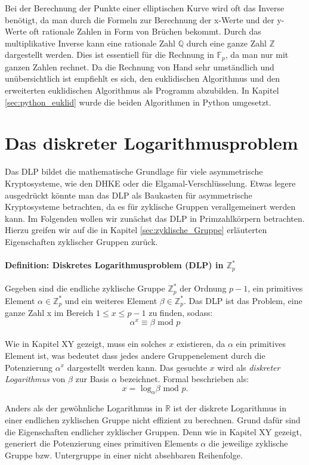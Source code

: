 Bei der Berechnung der Punkte einer elliptischen Kurve wird oft das Inverse benötigt, da man durch die Formeln zur Berechnung der x-Werte und der y-Werte oft rationale Zahlen in Form von Brüchen bekommt. Durch das multiplikative Inverse kann eine rationale Zahl $\mathbb{Q}$ durch eine ganze Zahl $\mathbb{Z}$ dargestellt werden. Dies ist essentiell für die Rechnung in $\mathbb{F}_p$, da man nur mit ganzen Zahlen rechnet. Da die Rechnung von Hand sehr umständlich und unübersichtlich ist empfiehlt es sich, den euklidischen Algorithmus und den erweiterten euklidischen Algorithmus als Programm abzubilden. In Kapitel \ref{sec:python_euklid} wurde die beiden Algorithmen in Python umgesetzt.

\section{Das diskreter Logarithmusproblem} \label{sec:Das_diskrete_Logarithmusproblem}
Das DLP bildet die mathematische Grundlage für viele asymmetrische Kryptosysteme, wie den DHKE oder die Elgamal-Verschlüsselung. Etwas legere ausgedrückt könnte man das DLP als Baukasten für asymmetrische Kryptosysteme betrachten, da es für zyklische Gruppen verallgemeinert werden kann. Im Folgenden wollen wir zunächst das DLP in Primzahlkörpern betrachten. Hierzu greifen wir auf die in Kapitel \ref{sec:zyklische_Gruppe} erläuterten Eigenschaften zyklischer Gruppen zurück. 

\paragraph{Definition: Diskretes Logarithmusproblem (DLP) in $\mathbb{Z}^*_p$}
Gegeben sind die endliche zyklische Gruppe $\mathbb{Z}^*_p$ der Ordnung $p-1$, ein primitives Element $\alpha \in \mathbb{Z}^*_p$ und ein weiteres Element $\beta \in \mathbb{Z}^*_p$. Das DLP ist das Problem, eine ganze Zahl x im Bereich $1 \leq x \leq p-1$ zu finden, sodass: $$\alpha^x \equiv \beta \text{ mod } p$$\\

Wie in Kapitel XY gezeigt, muss ein solches $x$ existieren, da $\alpha$ ein primitives Element ist, was bedeutet dass jedes andere Gruppenelement durch die Potenzierung $\alpha^x$ dargestellt werden kann. Das gesuchte $x$ wird als \textit{diskreter Logarithmus} von $\beta$ zur Basis $\alpha$ bezeichnet. Formal beschrieben als: $$x = \text{ log}_\alpha \beta \text{ mod } p \text{.}$$

Anders als der gewöhnliche Logarithmus in $\mathbb{R}$ ist der diskrete Logarithmus in einer endlichen zyklischen Gruppe nicht effizient zu berechnen. Grund dafür sind die Eigenschaften endlicher zyklischer Gruppen. Denn wie in Kapitel XY gezeigt, generiert die Potenzierung eines primitiven Elements $\alpha$ die jeweilige zyklische Gruppe bzw. Untergruppe in einer nicht absehbaren Reihenfolge.\\

